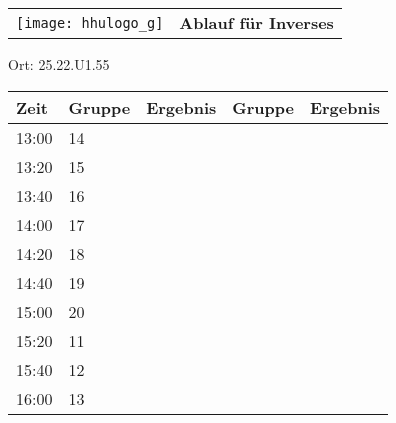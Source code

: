 \documentclass[a4paper,10pt]{article}
\def\spield{Inverses}
\def\raumdd{25.22.U1.55}
\begin{document}
  \begin{tabularx}{\textwidth}{lc}
    \texttt{[image: hhulogo\_g]}
  & {\Huge \textbf{Ablauf für \spield}}
  \end{tabularx}
  \LARGE
  \begin{center}
    \vspace{1cm} 
    Ort: \raumdd
  \end{center}
    \vspace{2cm} 
    \begin{tabularx}{\textwidth}{X||X|X||X|X}
	\textbf{Zeit} &\textbf{Gruppe} & \textbf{Ergebnis} &\textbf{Gruppe} & \textbf{Ergebnis}  	\\ \hline \hline
	13:00 &	14	&	&	&	\\ \hline
	13:20 &	15	&	&	&	\\ \hline
	13:40 &	16	&	&	&	\\ \hline

	14:00 &	17	&	&	&	\\ \hline
	14:20 &	18	&	&	&	\\ \hline
	14:40 &	19	&	&	&	\\ \hline

	15:00 &	20	&	&	&	\\ \hline
	15:20 &	11	&	&	&	\\ \hline
	15:40 &	12	&	&	&	\\ \hline

	16:00 &	13	&	&	&	\\ \hline
      
    \end{tabularx}
   
\end{document}
